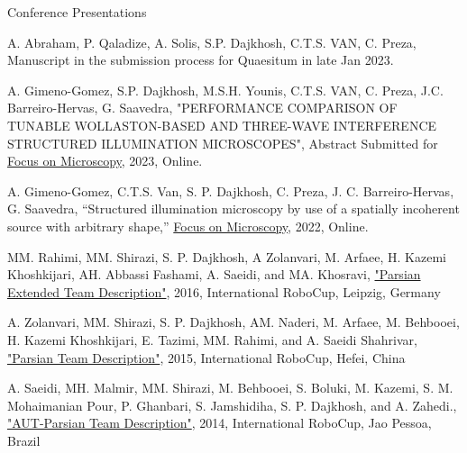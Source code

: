 \begin{cventries}
    \cventry
    {} %
    {Conference Presentations} %
    {} %
    {} %
    {
      \begin{cvitems} %
        \item{A. Abraham, P. Qaladize, A. Solis, S.P. Dajkhosh, C.T.S. VAN, C. Preza, Manuscript in the submission process for Quaesitum in late Jan 2023.}
        \item{A. Gimeno-Gomez, S.P. Dajkhosh, M.S.H. Younis, C.T.S. VAN, C. Preza, J.C. Barreiro-Hervas, G. Saavedra, "PERFORMANCE COMPARISON OF TUNABLE WOLLASTON-BASED AND THREE-WAVE INTERFERENCE STRUCTURED ILLUMINATION MICROSCOPES", Abstract Submitted for \href{https://www.focusonmicroscopy.org/}{Focus on Microscopy}, 2023, Online.}
        \item{A. Gimeno-Gomez, C.T.S. Van, S. P. Dajkhosh, C. Preza, J. C. Barreiro-Hervas, G. Saavedra, “Structured illumination microscopy by use of a spatially incoherent source with arbitrary shape,” \href{https://www.focusonmicroscopy.org/}{Focus on Microscopy}, 2022, Online.}
        \item{MM. Rahimi, MM. Shirazi, S. P. Dajkhosh, A Zolanvari, M. Arfaee, H. Kazemi Khoshkijari, AH. Abbassi Fashami, A. Saeidi, and MA. Khosravi, \href{https://sites.google.com/view/steacher/amirkabir-university}{"Parsian Extended Team Description"}, 2016, International RoboCup, Leipzig, Germany}
        \item{A. Zolanvari, MM. Shirazi, S. P. Dajkhosh, AM. Naderi, M. Arfaee, M. Behbooei, H. Kazemi Khoshkijari, E. Tazimi, MM. Rahimi, and A. Saeidi Shahrivar, \href{https://sites.google.com/view/steacher/amirkabir-university}{"Parsian Team Description"}, 2015, International RoboCup, Hefei, China}
        \item{A. Saeidi, MH. Malmir, MM.  Shirazi, M.
        Behbooei, S. Boluki, M. Kazemi, S. M. Mohaimanian Pour, P. Ghanbari, S. Jamshidiha, S. P. Dajkhosh, and A. Zahedi., \href{https://sites.google.com/view/steacher/amirkabir-university}{"AUT-Parsian Team Description"}, 2014, International RoboCup, Jao Pessoa, Brazil}
      \end{cvitems}
    }
\end{cventries}
